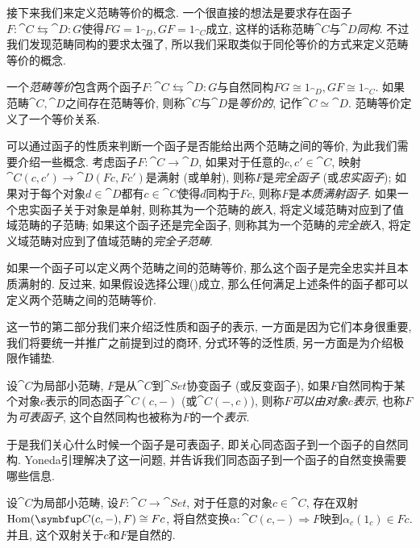 接下来我们来定义范畴等价的概念. 一个很直接的想法是要求存在函子$F\colon \cat{C}\leftrightarrows \cat{D}\colon G$使得$FG=1_{\cat{D}}, GF=1_{\cat{C}}$成立, 这样的话称范畴$\cat{C}$与$\cat{D}$\emph{同构}. 不过我们发现范畴同构的要求太强了\parencite[21]{riehl_category_2017}, 所以我们采取类似于同伦等价的方式来定义范畴等价的概念.

一个\emph{范畴等价}包含两个函子$F\colon \cat{C}\leftrightarrows \cat{D}\colon G$与自然同构$FG\cong 1_{\cat{D}}, GF\cong 1_{\cat{C}}$. 如果范畴$\cat{C}, \cat{D}$之间存在范畴等价, 则称$\cat{C}$与$\cat{D}$是\emph{等价的}, 记作$\cat{C}\simeq\cat{D}$. 范畴等价定义了一个等价关系\parencite[30, Lemma 1.5.5]{riehl_category_2017}.

可以通过函子的性质来判断一个函子是否能给出两个范畴之间的等价, 为此我们需要介绍一些概念. 考虑函子$F\colon\cat{C}\to\cat{D}$, 如果对于任意的$c, c'\in \cat{C}$, 映射$\cat{C}(c, c')\to \cat{D}(Fc, Fc')$是满射 (或单射), 则称$F$是\emph{完全函子} (或\emph{忠实函子}); 如果对于每个对象$d\in \cat{D}$都有$c\in\cat{C}$使得$d$同构于$Fc$, 则称$F$是\emph{本质满射函子}. 如果一个忠实函子关于对象是单射, 则称其为一个范畴的\emph{嵌入}, 将定义域范畴对应到了值域范畴的子范畴; 如果这个函子还是完全函子, 则称其为一个范畴的\emph{完全嵌入}, 将定义域范畴对应到了值域范畴的\emph{完全子范畴}.

\begin{theoremnoproof}\label{thm:categoryequivalence}
  如果一个函子可以定义两个范畴之间的范畴等价, 那么这个函子是完全忠实并且本质满射的. 反过来, 如果假设选择公理()成立, 那么任何满足上述条件的函子都可以定义两个范畴之间的范畴等价.
\end{theoremnoproof}

\bigskip

这一节的第二部分我们来介绍泛性质和函子的表示, 一方面是因为它们本身很重要, 我们将要统一并推广之前提到过的商环, 分式环等的泛性质, 另一方面是为介绍极限作铺垫.

设$\cat{C}$为局部小范畴, $F$是从$\cat{C}$到$\cat{Set}$协变函子 (或反变函子), 如果$F$自然同构于某个对象$c$表示的同态函子$\cat{C}(c, -)$ (或$\cat{C}(-, c)$), 则称$F$\emph{可以由对象$c$表示}, 也称$F$为\emph{可表函子}, 这个自然同构也被称为$F$的一个\emph{表示}.

于是我们关心什么时候一个函子是可表函子, 即关心同态函子到一个函子的自然同构. Yoneda引理解决了这一问题, 并告诉我们同态函子到一个函子的自然变换需要哪些信息.

\begin{theorem}\label{thm:yonedalemma}
  设$\cat{C}$为局部小范畴, 设$F\colon \cat{C}\to\cat{Set}$, 对于任意的对象$c\in\cat{C}$, 存在双射$\Hom (\cat{C}(c, -), F)\cong Fc$, 将自然变换$\alpha\colon \cat{C}(c, -)\Rightarrow F$映到$\alpha_c(1_c)\in Fc$. 并且, 这个双射关于$c$和$F$是自然的.
\end{theorem}

